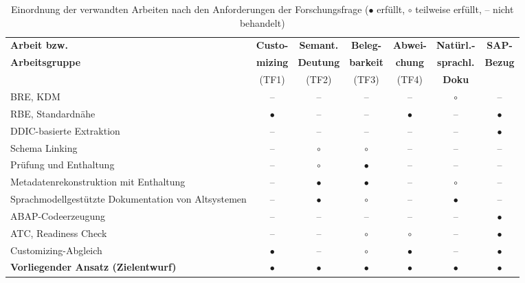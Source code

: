 \begin{table}[htbp]
\centering
\caption{Einordnung der verwandten Arbeiten nach den Anforderungen der Forschungsfrage ($\bullet$ erfüllt, $\circ$ teilweise erfüllt, -- nicht behandelt)}
\label{tab:konzeptmatrix}
\footnotesize
\setlength{\tabcolsep}{4pt}
\begin{tabular}{>{\raggedright\arraybackslash}p{4.0cm}cccccc}
\toprule
\textbf{Arbeit bzw.} & \textbf{Custo-} & \textbf{Semant.} & \textbf{Beleg-} & \textbf{Abwei-} & \textbf{Natürl.-} & \textbf{SAP-} \\
\textbf{Arbeitsgruppe} & \textbf{mizing} & \textbf{Deutung} & \textbf{barkeit} & \textbf{chung} & \textbf{sprachl.} & \textbf{Bezug} \\
 & (TF1) & (TF2) & (TF3) & (TF4) & \textbf{Doku} & \\
\midrule
BRE, KDM \cite{wang_business_2004, paradauskas_business_2006, perez-castillo_knowledge_2011} & -- & -- & -- & -- & $\circ$ & -- \\
RBE, Standardnähe \cite{nuttgens_reverse_1999, sekatzek_messung_2009} & $\bullet$ & -- & -- & $\bullet$ & -- & $\bullet$ \\
DDIC-basierte Extraktion \cite{berti_generic_2023} & -- & -- & -- & -- & -- & $\bullet$ \\
Schema Linking \cite{katsogiannis-meimarakis_-depth_2026, wang_autolink_2026, safdarian_schemagraphsql_2026, cai_columbo_2025} & -- & $\circ$ & $\circ$ & -- & -- & -- \\
Prüfung und Enthaltung \cite{allemang_increasing_2025, theologitis_thucy_2026, anvekar_traceback_2026, somov_confidence_2025} & -- & $\circ$ & $\bullet$ & -- & -- & -- \\
Metadatenrekonstruktion mit Enthaltung \cite{helwig_metadata_2026} & -- & $\bullet$ & $\bullet$ & -- & $\circ$ & -- \\
Sprachmodellgestützte Dokumentation von Altsystemen \cite{diggs_leveraging_2024, latreche_llm-assisted_2026, de_macedo_reversa_2026} & -- & $\bullet$ & $\circ$ & -- & $\bullet$ & -- \\
ABAP-Codeerzeugung \cite{wallraven_benchmarking_2026} & -- & -- & -- & -- & -- & $\bullet$ \\
ATC, Readiness Check \cite{sap_ccm_atc} & -- & -- & $\circ$ & $\circ$ & -- & $\bullet$ \\
Customizing-Abgleich \cite{sap_customizing_nodate} & $\bullet$ & -- & $\circ$ & $\bullet$ & -- & $\bullet$ \\
\midrule
\textbf{Vorliegender Ansatz (Zielentwurf)} & $\bullet$ & $\bullet$ & $\bullet$ & $\bullet$ & $\bullet$ & $\bullet$ \\
\bottomrule
\end{tabular}
\end{table}

